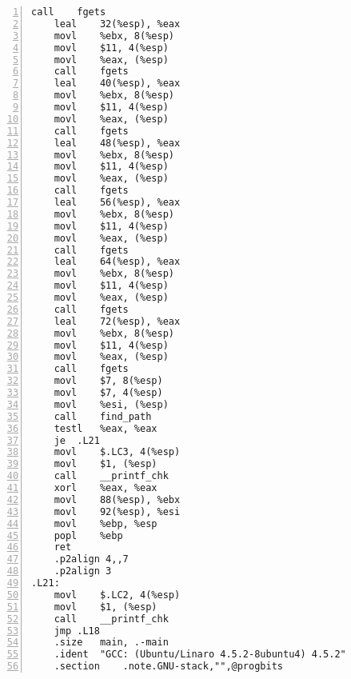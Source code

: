 \documentclass[12pt,letterpaper]{article}
\begin{document}
\begin{Verbatim}[fontsize=\relsize{-2},numbers=left]
	call	fgets
	leal	32(%esp), %eax
	movl	%ebx, 8(%esp)
	movl	$11, 4(%esp)
	movl	%eax, (%esp)
	call	fgets
	leal	40(%esp), %eax
	movl	%ebx, 8(%esp)
	movl	$11, 4(%esp)
	movl	%eax, (%esp)
	call	fgets
	leal	48(%esp), %eax
	movl	%ebx, 8(%esp)
	movl	$11, 4(%esp)
	movl	%eax, (%esp)
	call	fgets
	leal	56(%esp), %eax
	movl	%ebx, 8(%esp)
	movl	$11, 4(%esp)
	movl	%eax, (%esp)
	call	fgets
	leal	64(%esp), %eax
	movl	%ebx, 8(%esp)
	movl	$11, 4(%esp)
	movl	%eax, (%esp)
	call	fgets
	leal	72(%esp), %eax
	movl	%ebx, 8(%esp)
	movl	$11, 4(%esp)
	movl	%eax, (%esp)
	call	fgets
	movl	$7, 8(%esp)
	movl	$7, 4(%esp)
	movl	%esi, (%esp)
	call	find_path
	testl	%eax, %eax
	je	.L21
	movl	$.LC3, 4(%esp)
	movl	$1, (%esp)
	call	__printf_chk
	xorl	%eax, %eax
	movl	88(%esp), %ebx
	movl	92(%esp), %esi
	movl	%ebp, %esp
	popl	%ebp
	ret
	.p2align 4,,7
	.p2align 3
.L21:
	movl	$.LC2, 4(%esp)
	movl	$1, (%esp)
	call	__printf_chk
	jmp	.L18
	.size	main, .-main
	.ident	"GCC: (Ubuntu/Linaro 4.5.2-8ubuntu4) 4.5.2"
	.section	.note.GNU-stack,"",@progbits
\end{Verbatim}
\end{document}
